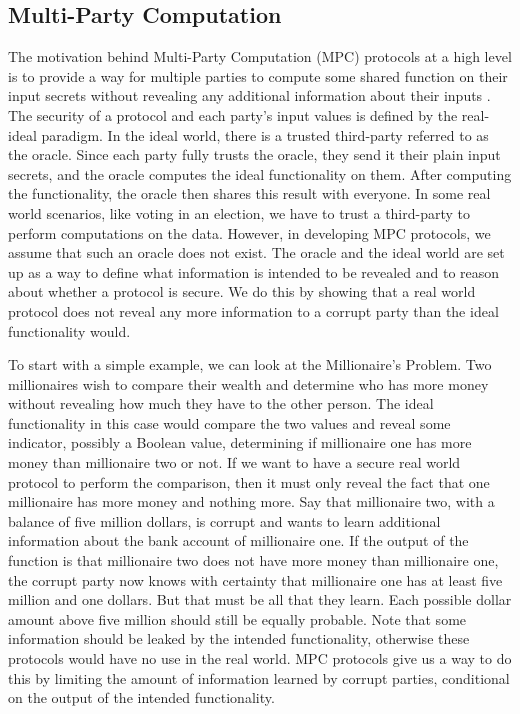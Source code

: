 \documentclass{article}
\begin{document}
\subsection{Multi-Party Computation}
The motivation behind Multi-Party Computation (MPC) protocols at a high level is to provide a way for multiple parties to compute some shared function on their input secrets without revealing any additional information about their inputs \cite{evans2018pragmatic}. The security of a protocol and each party's input values is defined by the real-ideal paradigm. In the ideal world, there is a trusted third-party referred to as the oracle. Since each party fully trusts the oracle, they send it their plain input secrets, and the oracle computes the ideal functionality on them. After computing the functionality, the oracle then shares this result with everyone. In some real world scenarios, like voting in an election, we have to trust a third-party to perform computations on the data. However, in developing MPC protocols, we assume that such an oracle does not exist. The oracle and the ideal world are set up as a way to define what information is intended to be revealed and to reason about whether a protocol is secure. We do this by showing that a real world protocol does not reveal any more information to a corrupt party than the ideal functionality would.

To start with a simple example, we can look at the Millionaire's Problem. Two millionaires wish to compare their wealth and determine who has more money without revealing how much they have to the other person. The ideal functionality in this case would compare the two values and reveal some indicator, possibly a Boolean value, determining if millionaire one has more money than millionaire two or not. If we want to have a secure real world protocol to perform the comparison, then it must only reveal the fact that one millionaire has more money and nothing more. Say that millionaire two, with a balance of five million dollars, is corrupt and wants to learn additional information about the bank account of millionaire one. If the output of the function is that millionaire two does not have more money than millionaire one, the corrupt party now knows with certainty that millionaire one has at least five million and one dollars. But that must be all that they learn. Each possible dollar amount above five million should still be equally probable. Note that some information should be leaked by the intended functionality, otherwise these protocols would have no use in the real world. MPC protocols give us a way to do this by limiting the amount of information learned by corrupt parties, conditional on the output of the intended functionality.
\end{document}
